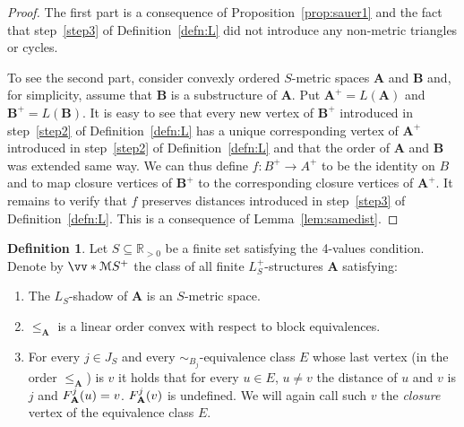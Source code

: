 \documentclass{elsarticle}
\def\ordclasssup#1#2{\vv*{#1}{#2}}
\def\str#1{\mathbf {#1}}
\def\func#1#2{\nbfunc{\ifstrempty{#1}{}{\str{#1}}}{#2}}
\def\nbfunc#1#2{F\ifstrempty{#1}{}{_{#1}}\ifstrempty{#2}{}{^{#2}}}
\theoremstyle{plain}
\theoremstyle{definition}
\newtheorem{definition}[theorem]{Definition}
\theoremstyle{remark}
\begin{document}
\begin{proof}
The first part is a consequence of Proposition~\ref{prop:sauer1} and the fact
that step~\ref{step3} of Definition~\ref{defn:L} did not introduce any non-metric triangles or cycles.

To see the second part, consider convexly ordered $S$-metric spaces $\str{A}$ and $\str{B}$ and, for simplicity,
assume that $\str{B}$ is a substructure of $\str{A}$. Put $\str{A}^+=L(\str{A})$ and $\str{B}^+=L(\str{B})$.
It is easy to see that every new vertex of $\str B^+$ introduced in step~\ref{step2} of Definition~\ref{defn:L} 
has a unique corresponding vertex of $\str A^+$ introduced in step~\ref{step2} of Definition~\ref{defn:L} and that
the order of $\str{A}$ and $\str{B}$ was extended same way.  We can
thus define $f\colon B^+\to A^+$ to be the identity on $B$ and to map closure vertices of $\str{B}^+$ to the
corresponding closure vertices of $\str{A}^+$. It remains to verify that $f$ preserves distances
introduced in step~\ref{step3} of Definition~\ref{defn:L}. This is a consequence of Lemma~\ref{lem:samedist}.
\end{proof}

\begin{definition}
\label{defn:Mp}
Let $S\subseteq \mathbb R_{>0}$ be a finite set satisfying the 4-values condition.
Denote by $\ordclasssup{\mathcal M}{S}^+$ the class of all finite $L^+_S$-structures $\str{A}$ satisfying:
\begin{enumerate}
 \item\label{cond:1} The $L_S$-shadow of $\str{A}$ is an $S$-metric space.
 \item\label{cond:2} $\leq_\str{A}$ is a linear order convex with respect to block equivalences.
 \item\label{cond:3} For every $j\in J_S$ and every $\sim_{B_j}$-equivalence class $E$ whose last vertex (in the order $\leq_\str{A}$) is $v$ it holds
    that for every $u\in E$, $u\neq v$ the distance of $u$ and $v$ is $j$ and $\func{A}{j}(u)=v$. $\func{A}{j}(v)$ is undefined.
We will again call such $v$ the \emph{closure} vertex of the equivalence class $E$.
\end{enumerate}
\end{definition}
\end{document}
